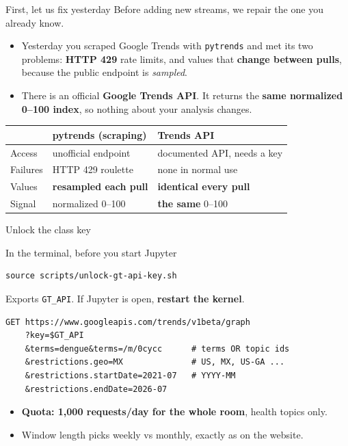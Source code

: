 \documentclass[aspectratio=169,11pt]{beamer}
\begin{document}
\begin{frame}{First, let us fix yesterday}
  Before adding new streams, we repair the one you already know.
  \begin{itemize}
    \item Yesterday you scraped Google Trends with \texttt{pytrends} and met its two
          problems: \textbf{HTTP 429} rate limits, and values that \textbf{change between
          pulls}, because the public endpoint is \emph{sampled}.
    \item There is an official \textbf{Google Trends API}. It returns the \textbf{same
          normalized 0--100 index}, so nothing about your analysis changes.
  \end{itemize}
  \vspace{0.3em}
  \begin{center}
  \footnotesize
  \begin{tabular}{lll}
    \hline
     & \textbf{pytrends (scraping)} & \textbf{Trends API} \\
    \hline
    Access   & unofficial endpoint          & documented API, needs a key \\
    Failures & HTTP 429 roulette            & none in normal use \\
    Values   & \textbf{resampled each pull} & \textbf{identical every pull} \\
    Signal   & normalized 0--100            & \textbf{the same} 0--100 \\
    \hline
  \end{tabular}
  \end{center}
\end{frame}

\begin{frame}[fragile]{Unlock the class key}
  \begin{block}{In the terminal, before you start Jupyter}
  \begin{lstlisting}
source scripts/unlock-gt-api-key.sh
  \end{lstlisting}
  \end{block}
  Exports \texttt{GT\_API}. If Jupyter is open, \textbf{restart the kernel}.
  \begin{lstlisting}
GET https://www.googleapis.com/trends/v1beta/graph
    ?key=$GT_API
    &terms=dengue&terms=/m/0cycc      # terms OR topic ids
    &restrictions.geo=MX              # US, MX, US-GA ...
    &restrictions.startDate=2021-07   # YYYY-MM
    &restrictions.endDate=2026-07
  \end{lstlisting}
  \begin{itemize}
    \item \textbf{Quota: 1,000 requests/day for the whole room}, health topics only.
    \item Window length picks weekly vs monthly, exactly as on the website.
  \end{itemize}
\end{frame}
\end{document}
